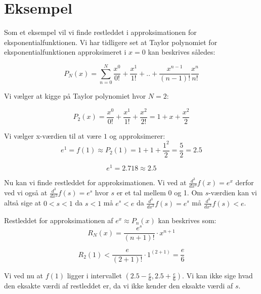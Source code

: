\section{Eksempel}
Som et eksempel vil vi finde restleddet i approksimationen for eksponentialfunktionen.
Vi har tidligere set at Taylor polynomiet for eksponentialfunktionen approksimeret i $x=0$ kan beskrives således:

\[
P_N(x)=\sum^{N}_{n=0}\frac{x^{0}}{0!}+\frac{x^{1}}{1!}+..+\frac{x^{n-1}}{(n-1)!}\frac{x^{n}}{n!}
\]

Vi vælger at kigge på Taylor polynomiet hvor $N=2$:

\[
P_2(x)=\frac{x^{0}}{0!}+\frac{x^{1}}{1!}+\frac{x^{2}}{2!}=1+x+\frac{x^{2}}{2}
\]

Vi vælger x-værdien til at være $1$ og approksimerer:
\[
e^{1}=f(1)\approx P_{2}(1)=1+1+\frac{1^{2}}{2}=\frac{5}{2}=2.5
\]

\[
e^{1}=2.718\approx 2.5
\]

Nu kan vi finde restleddet for approksimationen.
Vi ved at $\frac{d^3}{dx^3}f(x)=e^{x}$ derfor ved vi også at $\frac{d^3}{dx^3}f(s)=e^{s}$ hvor $s$ er et tal mellem 0 og 1. Om $s$-værdien kan vi altså sige at $0<s<1$ da $s<1$ må $e^{s}<e$ da $\frac{d^3}{dx^3}f(s)=e^{s}$ må $\frac{d^3}{dx^3}f(s)<e$.

Restleddet for approksimationen af $e^{x}\approx P_n(x)$ kan beskrives som:
\[
R_N(x)={\frac{e^{s}}{(n+1)!}}\cdot x^{n+1}
\]

\[
R_2(1)<\frac{e}{(2+1)!}\cdot1^{(2+1)}=\frac{e}{6}
\]

Vi ved nu at $f(1)$ ligger i intervallet $(2.5-\frac{e}{6} , 2.5+\frac{e}{6})$. Vi kan ikke sige hvad den eksakte værdi af restleddet er, da vi ikke kender den eksakte værdi af $s$.
